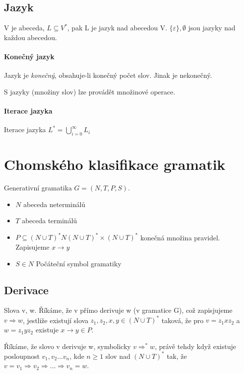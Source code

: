 \documentclass[a4wide]{report}
\begin{document}
\subsection{Jazyk}

V je abeceda, $L \subseteq V^*$, pak L je jazyk nad abecedou V. $\{\varepsilon\}, \emptyset$ jsou jazyky nad každou abecedou.

\paragraph{Konečný jazyk}
Jazyk je \emph{konečný}, obsahuje-li konečný počet slov. Jinak je nekonečný.

S jazyky (množiny slov) lze provádět množinové operace.

\paragraph{Iterace jazyka}
Iterace jazyka $L^* = \bigcup^\infty_{i=0} L_i$

\section{Chomského klasifikace gramatik}

Generativní gramatika $G = (N,T,P,S)$.
\begin{itemize}
	\item $N$ abeceda neterminálů
	\item $T$ abeceda terminálů
	\item $P \subseteq (N \cup T)^* N (N \cup T)^* \times (N \cup T)^*$ konečná množina pravidel. Zapisujeme $ x \to y $
	\item $S \in N$ Počáteční symbol gramatiky
\end{itemize}

\subsection{Derivace}
Slova v, w. Říkáme, že v přímo derivuje w (v gramatice G), což zapisjujeme  $v \Rightarrow w$, jestliže existují slova $z_1, z_2, x, y \in (N \cup T)^*$ taková, že pro $v = z_1 x z_2$ a $w = z_1 y z_2$ existuje $x \to y \in P$.	

Říkáme, že slovo v derivuje w, symbolicky $v \Rightarrow^* w$, právě tehdy když existuje posloupnost $v_1, v_2 \dots v_n$, kde $n \geq 1$ slov nad $(N \cup T)^*$ tak, že $v = v_1 \Rightarrow v_2 \Rightarrow \dots \Rightarrow v_n = w$.
\end{document}
